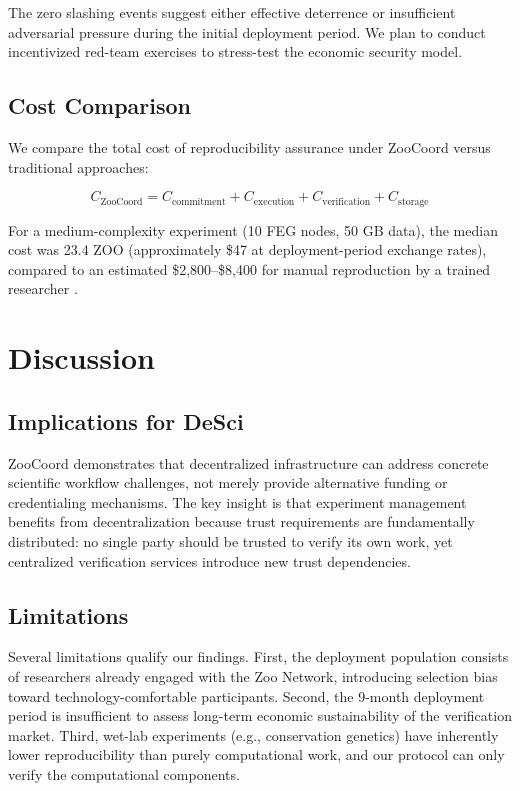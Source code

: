 \documentclass[11pt,a4paper]{article}
\begin{document}
The zero slashing events suggest either effective deterrence or insufficient adversarial pressure during the initial deployment period.
We plan to conduct incentivized red-team exercises to stress-test the economic security model.

\subsection{Cost Comparison}

We compare the total cost of reproducibility assurance under ZooCoord versus traditional approaches:

\begin{equation}
    C_{\text{ZooCoord}} = C_{\text{commitment}} + C_{\text{execution}} + C_{\text{verification}} + C_{\text{storage}}
\end{equation}

For a medium-complexity experiment (10 FEG nodes, 50 GB data), the median cost was 23.4 ZOO (approximately \$47 at deployment-period exchange rates), compared to an estimated \$2,800--\$8,400 for manual reproduction by a trained researcher \citep{freedman2015economics}.

\section{Discussion}
\label{sec:discussion}

\subsection{Implications for DeSci}

ZooCoord demonstrates that decentralized infrastructure can address concrete scientific workflow challenges, not merely provide alternative funding or credentialing mechanisms.
The key insight is that experiment management benefits from decentralization because trust requirements are fundamentally distributed: no single party should be trusted to verify its own work, yet centralized verification services introduce new trust dependencies.

\subsection{Limitations}

Several limitations qualify our findings.
First, the deployment population consists of researchers already engaged with the Zoo Network, introducing selection bias toward technology-comfortable participants.
Second, the 9-month deployment period is insufficient to assess long-term economic sustainability of the verification market.
Third, wet-lab experiments (e.g., conservation genetics) have inherently lower reproducibility than purely computational work, and our protocol can only verify the computational components.
\end{document}
